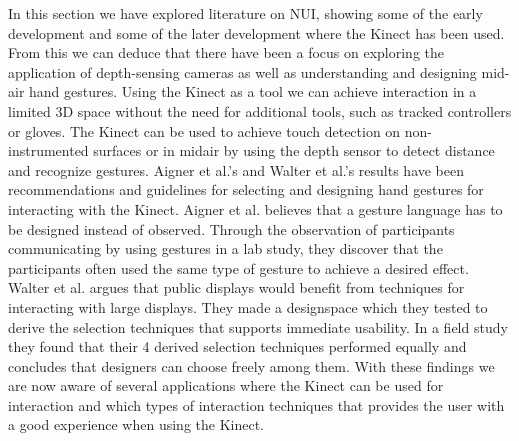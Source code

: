 In this section we have explored literature on NUI, showing some of the early development and some of the later development where the Kinect has been used. From this we can deduce that there have been a focus on exploring the application of depth-sensing cameras as well as understanding and designing mid-air hand gestures.
Using the Kinect as a tool we can achieve interaction in a limited 3D space without the need for additional tools, such as tracked controllers or gloves. The Kinect can be used to achieve touch detection on non-instrumented surfaces or in midair by using the depth sensor to detect distance and recognize gestures.  Aigner et al.'s and Walter et al.'s results have been recommendations and guidelines for selecting and designing hand gestures for interacting with the Kinect. Aigner  et al.\cite{Aigner:2012} believes that a gesture language has to be designed instead of observed. Through the observation of participants communicating by using gestures in a lab study, they discover that the participants often used the same type of gesture to achieve a desired effect.
Walter et al. argues that public displays would benefit from techniques for interacting with large displays. They made a designspace which they tested to derive the selection techniques that supports immediate usability. In a field study they found that their 4 derived selection techniques performed equally and concludes that designers can choose freely among them. With these findings we are now aware of several applications where the Kinect can be used for interaction and which types of interaction techniques that provides the user with a good experience when using the Kinect.